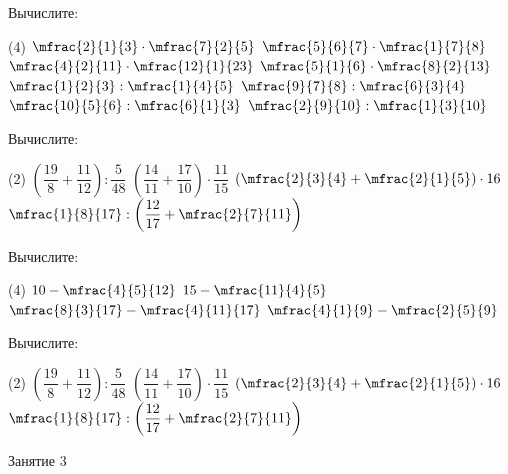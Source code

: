 \begin{class}[number=2]
	\begin{listofex}
		\item Вычислите:
		\begin{tasks}(4)
			\task \( \mfrac{2}{1}{3}\cdot\mfrac{7}{2}{5} \)
			\task \( \mfrac{5}{6}{7}\cdot\mfrac{1}{7}{8} \)
			\task \( \mfrac{4}{2}{11}\cdot\mfrac{12}{1}{23} \)
			\task \( \mfrac{5}{1}{6}\cdot\mfrac{8}{2}{13} \)
			\task \( \mfrac{1}{2}{3}:\mfrac{1}{4}{5} \)
			\task \( \mfrac{9}{7}{8}:\mfrac{6}{3}{4} \)
			\task \( \mfrac{10}{5}{6}:\mfrac{6}{1}{3} \)
			\task \( \mfrac{2}{9}{10}:\mfrac{1}{3}{10} \)
		\end{tasks}
		\item Вычислите:
		\begin{tasks}(2)
			\task \( \left( \dfrac{19}{8}+\dfrac{11}{12} \right):\dfrac{5}{48} \)
			\task \( \left( \dfrac{14}{11}+\dfrac{17}{10} \right)\cdot\dfrac{11}{15} \)
			\task \( \left( \mfrac{2}{3}{4}+\mfrac{2}{1}{5} \right)\cdot16 \)
			\task \( \mfrac{1}{8}{17}:\left( \dfrac{12}{17}+\mfrac{2}{7}{11} \right) \)
		\end{tasks}
	\end{listofex}
\end{class}

\begin{homework}[number=1]
	\begin{listofex}
		\item Вычислите:
		\begin{tasks}(4)
			\task \( 10-\mfrac{4}{5}{12} \)
			\task \( 15-\mfrac{11}{4}{5} \)
			\task \( \mfrac{8}{3}{17}-\mfrac{4}{11}{17} \)
			\task \( \mfrac{4}{1}{9}-\mfrac{2}{5}{9} \)
		\end{tasks}
		\item Вычислите:
		\begin{tasks}(2)
			\task \( \left( \dfrac{19}{8}+\dfrac{11}{12} \right):\dfrac{5}{48} \)
			\task \( \left( \dfrac{14}{11}+\dfrac{17}{10} \right)\cdot\dfrac{11}{15} \)
			\task \( \left( \mfrac{2}{3}{4}+\mfrac{2}{1}{5} \right)\cdot16 \)
			\task \( \mfrac{1}{8}{17}:\left( \dfrac{12}{17}+\mfrac{2}{7}{11} \right) \)
		\end{tasks}
	\end{listofex}
\end{homework}

\begin{class}[number=3]
	\begin{listofex}
		\item Занятие 3 
	\end{listofex}
\end{class}

